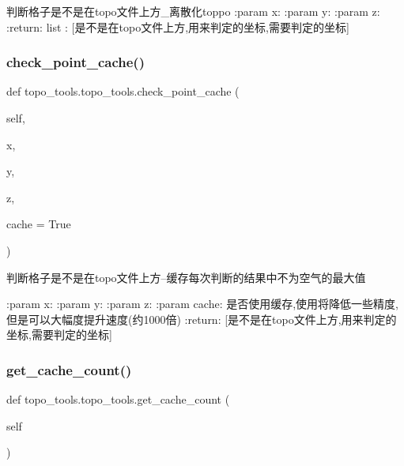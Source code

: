 \begin{DoxyVerb}判断格子是不是在topo文件上方_离散化toppo
:param x:
:param y:
:param z:
:return: list : [是不是在topo文件上方,用来判定的坐标,需要判定的坐标]
\end{DoxyVerb}
 \mbox{\label{classtopo__tools_1_1topo__tools_a7331c454b277a899a176db176b3d4e62}} 
\subsubsection{\texorpdfstring{check\+\_\+point\+\_\+cache()}{check\_point\_cache()}}
{\footnotesize\ttfamily def topo\+\_\+tools.\+topo\+\_\+tools.\+check\+\_\+point\+\_\+cache (\begin{DoxyParamCaption}\item[{}]{self,  }\item[{}]{x,  }\item[{}]{y,  }\item[{}]{z,  }\item[{}]{cache = {\ttfamily True} }\end{DoxyParamCaption})}

\begin{DoxyVerb}判断格子是不是在topo文件上方--缓存每次判断的结果中不为空气的最大值

:param x:
:param y:
:param z:
:param cache: 是否使用缓存,使用将降低一些精度,但是可以大幅度提升速度(约1000倍)
:return: [是不是在topo文件上方,用来判定的坐标,需要判定的坐标]
\end{DoxyVerb}
 \mbox{\label{classtopo__tools_1_1topo__tools_a01655c25b44d883096a9f9b964003708}} 
\subsubsection{\texorpdfstring{get\+\_\+cache\+\_\+count()}{get\_cache\_count()}}
{\footnotesize\ttfamily def topo\+\_\+tools.\+topo\+\_\+tools.\+get\+\_\+cache\+\_\+count (\begin{DoxyParamCaption}\item[{}]{self }\end{DoxyParamCaption})}

